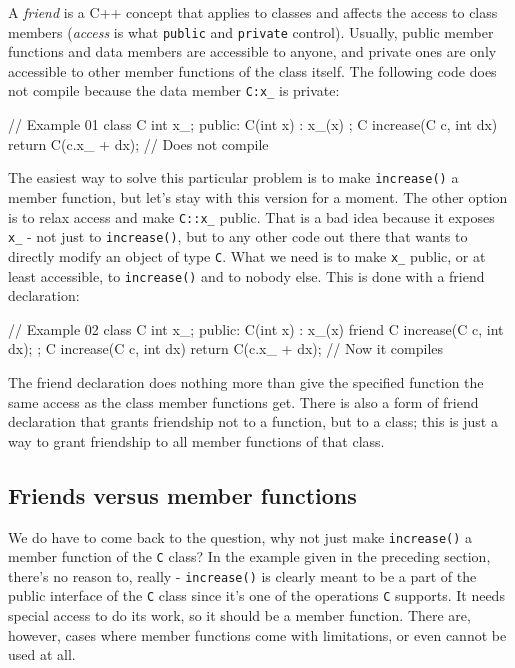 A \emph{friend} is a C++ concept that applies to classes and affects the access to class members (\emph{access} is what \texttt{public} and \texttt{private} control). Usually, public member functions and data members are accessible to anyone, and private ones are only accessible to other member functions of the class itself. The following code does not compile because the data member \texttt{C:x\_} is private:

\begin{code}
// Example 01
class C {
  int x_;
  public:
  C(int x) : x_(x) {}
};
C increase(C c, int dx) {
  return C(c.x_ + dx);     // Does not compile
}
\end{code}

The easiest way to solve this particular problem is to make \texttt{increase()} a member function, but let's stay with this version for a moment. The other option is to relax access and make \texttt{C::x\_} public. That is a bad idea because it exposes \texttt{x\_} - not just to \texttt{increase()}, but to any other code out there that wants to directly modify an object of type \texttt{C}. What we need is to make \texttt{x\_} public, or at least accessible, to \texttt{increase()} and to nobody else. This is done with a friend declaration:

\begin{code}
// Example 02
class C {
  int x_;
  public:
  C(int x) : x_(x) {}
  friend C increase(C c, int dx);
};
C increase(C c, int dx) {
  return C(c.x_ + dx);    // Now it compiles
}
\end{code}

The friend declaration does nothing more than give the specified function the same access as the class member functions get. There is also a form of friend declaration that grants friendship not to a function, but to a class; this is just a way to grant friendship to all member functions of that class.

\subsection{Friends versus member functions}

We do have to come back to the question, why not just make \texttt{increase()} a member function of the \texttt{C} class? In the example given in the preceding section, there's no reason to, really - \texttt{increase()} is clearly meant to be a part of the public interface of the \texttt{C} class since it's one of the operations \texttt{C} supports. It needs special access to do its work, so it should be a member function. There are, however, cases where member functions come with limitations, or even cannot be used at all.

